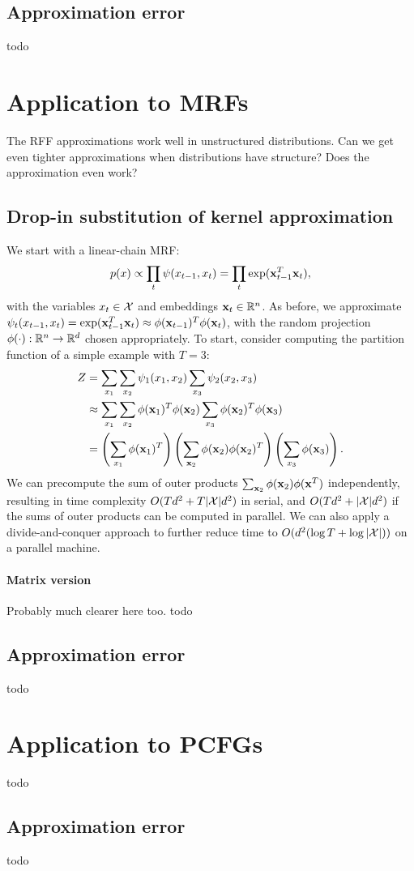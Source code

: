 \documentclass{article}
\begin{document}
\subsection{Approximation error}
todo

\section{Application to MRFs}
The RFF approximations work well in unstructured distributions.
Can we get even tighter approximations when distributions have structure?
Does the approximation even work?

\subsection{Drop-in substitution of kernel approximation}
We start with a linear-chain MRF:
$$p(x) \propto \prod_t \psi(x_{t-1},x_t) = \prod_t \exp(\mathbf{x}_{t-1}^T\mathbf{x}_t),$$
with the variables $x_t\in\mathcal{X}$ and embeddings $\mathbf{x}_t\in\mathbb{R}^n$.
As before, we approximate
$\psi_t(x_{t-1}, x_t) = \exp(\mathbf{x}_{t-1}^T \mathbf{x}_t) \approx \phi(\mathbf{x}_{t-1})^T\phi(\mathbf{x}_t)$,
with the random projection $\phi(\cdot): \mathbb{R}^n \to \mathbb{R}^d$ chosen appropriately.
To start, consider computing the partition function of a simple example with $T=3$:
\begin{equation}
\begin{aligned}
Z
&= \sum_{x_1}\sum_{x_2} \psi_1(x_1, x_2) \sum_{x_3} \psi_2(x_2, x_3) \\
&\approx \sum_{x_1}\sum_{x_2} \phi(\mathbf{x}_1)^T\phi(\mathbf{x}_2) \sum_{x_3} \phi(\mathbf{x}_2)^T\phi(\mathbf{x}_3)\\
&= \left(\sum_{x_1} \phi(\mathbf{x}_1)^T\right) \left(\sum_{\mathbf{x}_2} \phi(\mathbf{x}_2)\phi(\mathbf{x}_2)^T\right)
    \left(\sum_{x_3}\phi(\mathbf{x}_3)\right).
\end{aligned}
\end{equation}
We can precompute the sum of outer products $\sum_{\mathbf{x}_2}\phi(\mathbf{x}_2)\phi(\mathbf{x}^T)$ independently,
resulting in time complexity $O(Td^2 + T|\mathcal{X}|d^2)$ in serial,
and $O(Td^2 + |\mathcal{X}|d^2)$ if the sums of outer products can be computed in parallel.
We can also apply a divide-and-conquer approach to further
reduce time to $O(d^2(\log T + \log |\mathcal{X}|))$ on a parallel machine.

\paragraph{Matrix version}
Probably much clearer here too.
todo

\subsection{Approximation error}
todo

\section{Application to PCFGs}
todo

\subsection{Approximation error}
todo



\end{document}
